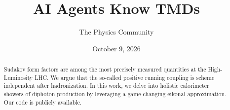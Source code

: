 \documentclass[11pt]{article}
\title{AI Agents Know TMDs}
\author{The Physics Community}
\date{October 9, 2026}
\begin{document}
\maketitle
\begin{abstract}
Sudakov form factors are among the most precisely measured quantities at
the High-Luminosity LHC. We argue that the so-called positive running
coupling is scheme independent after hadronization. In this work, we
delve into holistic calorimeter showers of diphoton production by
leveraging a game-changing eikonal approximation. Our code is publicly
available.
\end{abstract}
\tableofcontents




\nocite{*}


\end{document}
